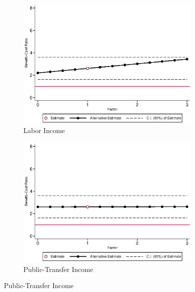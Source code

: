 \begin{figure}[H]
\caption{Benefit/cost Ratio vs.~Components, Females} \label{fig:bcrf_factor_f}

	\begin{subfigure}[h]{0.8\textwidth}
	\centering
	\caption{Labor Income} \label{fig:bcrf_inc_labor_f1}
	\includegraphics[width=\textwidth]{AppOutput/Sensitivity/bcrf_inc_labor_f1.eps}
	\end{subfigure}	
	
	\begin{subfigure}[h]{0.8\textwidth}
	\centering
	\caption{Public-Transfer Income} \label{fig:bcrf_transfer_f1}
	\includegraphics[width=\textwidth]{AppOutput/Sensitivity/bcrf_transfer_f1.eps}
	\end{subfigure}
\end{figure}
	
